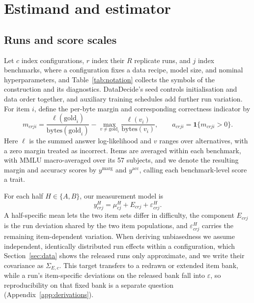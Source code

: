 \section{Estimand and estimator}
\label{sec:estimator}
\subsection{Runs and score scales}
Let $c$ index configurations, $r$ index their $R$ replicate runs, and $j$ index benchmarks, where a configuration fixes a data recipe, model size, and nominal hyperparameters, and Table~\ref{tab:notation} collects the symbols of the construction and its diagnostics. DataDecide's seed controls initialisation and data order together, and auxiliary training schedules add further run variation. For item $i$, define the per-byte margin and corresponding correctness indicator by
\begin{equation}
m_{crji}=\frac{\ell(\mathrm{gold}_i)}{\mathrm{bytes}(\mathrm{gold}_i)}-
\max_{v\ne\mathrm{gold}_i}\frac{\ell(v_i)}{\mathrm{bytes}(v_i)},
\qquad a_{crji}=\mathbf{1}\{m_{crji}>0\}.
\label{eq:scores}
\end{equation}
Here $\ell$ is the summed answer log-likelihood and $v$ ranges over alternatives, with a zero margin treated as incorrect. Items are averaged within each benchmark, with MMLU macro-averaged over its 57 subjects, and we denote the resulting margin and accuracy scores by $y^{\mathrm{marg}}$ and $y^{\mathrm{acc}}$, calling each benchmark-level score a trait.

For each half $H\in\{A,B\}$, our measurement model is
\begin{equation}
y^H_{crj}=\mu^H_{cj}+E_{crj}+\varepsilon^H_{crj}.
\label{eq:model}
\end{equation}
A half-specific mean lets the two item sets differ in difficulty, the component $E_{crj}$ is the run deviation shared by the two item populations, and $\varepsilon^H_{crj}$ carries the remaining item-dependent variation. When deriving unbiasedness we assume independent, identically distributed run effects within a configuration, which Section~\ref{sec:data} shows the released runs only approximate, and we write their covariance as $\Sigma_{E,c}$. This target transfers to a redrawn or extended item bank, while a run's item-specific deviations on the released bank fall into $\varepsilon$, so reproducibility on that fixed bank is a separate question (Appendix~\ref{app:derivations}).

